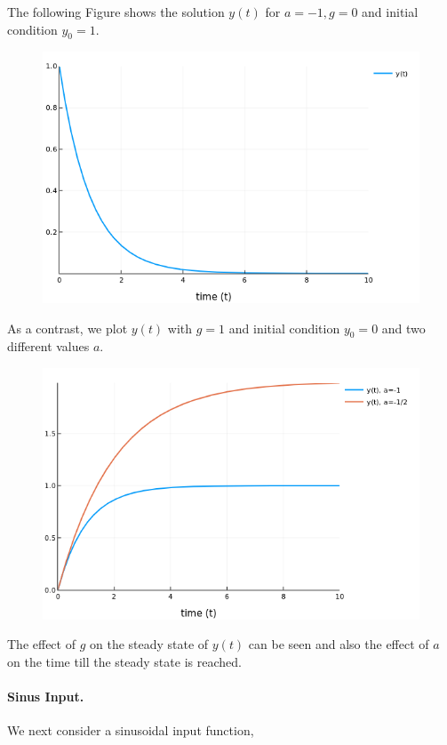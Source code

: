 The following Figure shows the solution $y(t)$ for $a=-1, g=0$ and initial condition $y_0 = 1$.

\begin{figure}[H]
	\includegraphics[scale=0.5]{images/ode_02_01.png}
\end{figure}

As a contrast, we plot $y(t)$ with $g=1$ and initial condition $y_0 = 0$ and two different values $a$.

\begin{figure}[H]
	\includegraphics[scale=0.5]{images/ode_02_02.png}
\end{figure}

The effect of $g$ on the steady state of $y(t)$ can be seen and also the effect of $a$ on the time till the steady state is reached.


\paragraph{Sinus Input.} We next consider a sinusoidal input function,

